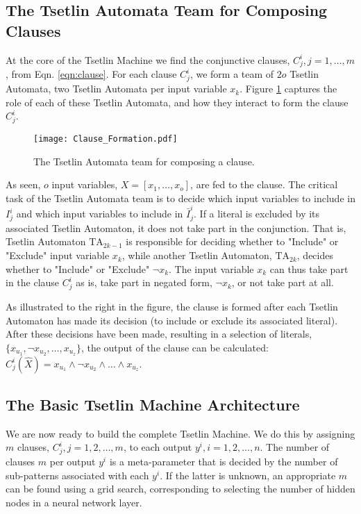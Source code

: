 \documentclass[11pt,a4paper]{article}
\begin{document}
\subsection{The Tsetlin Automata Team for Composing Clauses}

At the core of the Tsetlin Machine we find the conjunctive clauses, $C_j^i, j = 1, \ldots, m$, from Eqn. \ref{eqn:clause}. For each clause $C_j^i$, we form a team of $2o$ Tsetlin Automata, two Tsetlin Automata per input variable $x_k$. Figure \ref{figure:clause_formation} captures the role of each of these Tsetlin Automata, and how they interact to form the clause $C_j^i$.

\begin{figure}[!th]
\centering
\texttt{[image: Clause\_Formation.pdf]}
\caption{The Tsetlin Automata team for composing a clause.}
\label{figure:clause_formation}
\end{figure}

As seen, $o$ input variables, $X = [x_1, \ldots, x_o]$, are fed to the clause. The critical task of the Tsetlin Automata team is to decide which input variables to include in $I_j^i$ and which input variables to include in $\bar I_j^i$. If a literal is excluded by its associated Tsetlin Automaton, it does not take part in the conjunction.  That is, Tsetlin Automaton $\mathrm{TA}_{2k-1}$ is responsible for deciding whether to "Include" or "Exclude" input variable $x_k$, while another Tsetlin Automaton, $\mathrm{TA}_{2k}$, decides whether to "Include" or "Exclude" $\lnot x_k$. The input variable $x_k$ can thus take part in the clause $C^i_j$ as is, take part in negated form, $\lnot x_k$, or not take part at all.

As illustrated to the right in the figure, the clause is formed after each Tsetlin Automaton has made its decision (to include or exclude its associated literal). After these decisions have been made, resulting in a selection of literals, $\{x_{u_1}, \lnot x_{u_2}, \ldots, x_{u_z}\}$, the output of the clause can be calculated: $C_j^i(\hat{X}) = x_{u_1} \land \lnot x_{u_2} \land \ldots \land x_{u_z}$.

\subsection{The Basic Tsetlin Machine Architecture}
We are now ready to build the complete Tsetlin Machine. We do this by assigning $m$ clauses,  $C_j^i, j = 1, 2, \ldots, m$, to each output $y^i, i = 1, 2, \ldots, n$. The number of clauses $m$ per output $y^i$ is a meta-parameter that is decided by the number of sub-patterns associated with each $y^i$. If the latter is unknown, an appropriate $m$ can be found using a grid search, corresponding to selecting the number of hidden nodes in a neural network layer.
\end{document}
